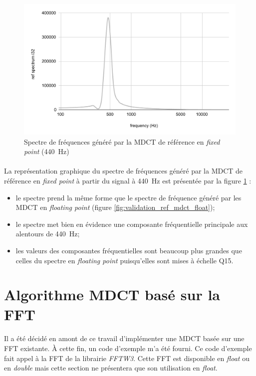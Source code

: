 \documentclass{article}
\begin{document}
    \begin{figure}[H]
        \centering
        \includegraphics[width=.8\linewidth]{./images/validation_ref_int.pdf}
        \caption{Spectre de fréquences généré par la MDCT de référence en \emph{fixed point} (\SI{440}{\hertz})}
        \label{fig:validation_ref_mdct_int}
    \end{figure}

    \paragraph{}
    La représentation graphique du spectre de fréquences généré par la MDCT de référence en \emph{fixed point} à partir du signal à \SI{440}{\hertz} est présentée par la figure \ref{fig:validation_ref_mdct_int} :
    \begin{itemize}
        \item le spectre prend la même forme que le spectre de fréquence généré par les MDCT en \emph{floating point} (figure \ref{fig:validation_ref_mdct_float});
        \item le spectre met bien en évidence une composante fréquentielle principale aux alentours de \SI{440}{\hertz};
        \item les valeurs des composantes fréquentielles sont beaucoup plus grandes que celles du spectre en \emph{floating point} puisqu'elles sont mises à échelle Q15.
    \end{itemize}



    \newpage
    \section{Algorithme MDCT basé sur la FFT}

    \paragraph{}
    Il a été décidé en amont de ce travail d'implémenter une MDCT basée sur une FFT existante. À cette fin, un code d'exemple m'a été fourni\cite{dsprelated}. Ce code d'exemple fait appel à la FFT de la librairie \emph{FFTW3}. Cette FFT est disponible en \emph{float} ou en \emph{double} mais cette section ne présentera que son utilisation en \emph{float}.
\end{document}
